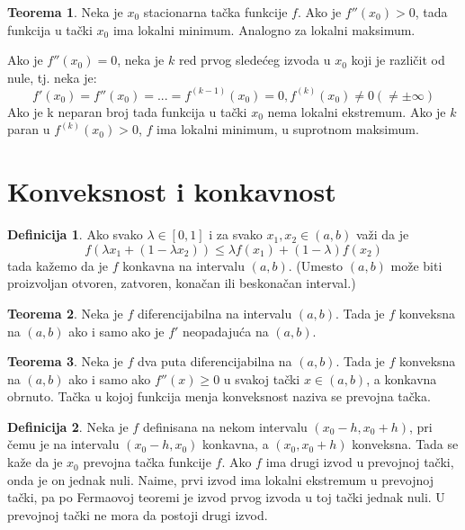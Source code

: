 \documentclass{article}
\theoremstyle{definition}
\newtheorem{definition}{Definicija}[section]
\newtheorem{theorem}{Teorema}[section]
\begin{document}
        \begin{theorem}
            Neka je $x_0$ stacionarna tačka funkcije $f$. Ako je $f''(x_0) > 0$, tada funkcija u tački $x_0$ ima lokalni minimum. Analogno za lokalni maksimum.

            Ako je $f''(x_0) = 0$, neka je $k$ red prvog sledećeg izvoda u $x_0$ koji je različit od nule, tj. neka je:
            $$f'(x_0) = f''(x_0) = ... = f^{(k-1)}(x_0) = 0, f^{(k)}(x_0) \neq 0 (\neq \pm \infty)$$
            Ako je k neparan broj tada funkcija u tački $x_0$ nema lokalni ekstremum. Ako je $k$ paran u $f^{(k)}(x_0) > 0$, $f$ ima lokalni minimum, u suprotnom maksimum.
        \end{theorem}

    \section{Konveksnost i konkavnost}
        \begin{definition}
            Ako svako $\lambda \in [0, 1]$ i za svako $x_1, x_2 \in (a, b)$ važi da je
            $$f(\lambda x_1 + (1 - \lambda x_2)) \leq \lambda f(x_1) + (1 - \lambda) f(x_2)$$
            tada kažemo da je $f$ konkavna na intervalu $(a, b)$. (Umesto $(a, b)$ može biti proizvoljan otvoren, zatvoren, konačan ili beskonačan interval.)
        \end{definition}

        \begin{theorem}
            Neka je $f$ diferencijabilna na intervalu $(a, b)$. Tada je $f$ konveksna na $(a, b)$ ako i samo ako je $f'$ neopadajuća na $(a, b)$.
        \end{theorem}

        \begin{theorem}
            Neka je $f$ dva puta diferencijabilna na $(a, b)$. Tada je $f$ konveksna na $(a, b)$ ako i samo ako $f''(x) \geq 0$ u svakoj tački $x \in (a, b)$, a konkavna obrnuto. Tačka u kojoj funkcija menja konveksnost naziva se prevojna tačka.
        \end{theorem}

        \begin{definition}
            Neka je $f$ definisana na nekom intervalu $(x_0 - h, x_0 + h)$, pri čemu je na intervalu $(x_0 - h, x_0)$ konkavna, a $(x_0, x_0 + h)$ konveksna. Tada se kaže da je $x_0$ prevojna tačka funkcije $f$. Ako $f$ ima drugi izvod u prevojnoj tački, onda je on jednak nuli. Naime, prvi izvod ima lokalni ekstremum u prevojnoj tački, pa po Fermaovoj teoremi je izvod prvog izvoda u toj tački jednak nuli. U prevojnoj tački ne mora da postoji drugi izvod.
        \end{definition}
\end{document}

